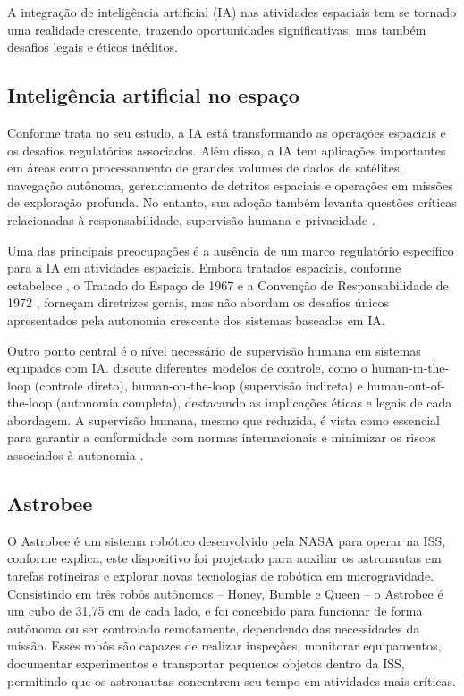 A integração de inteligência artificial (IA) nas atividades espaciais tem se tornado uma realidade crescente, trazendo oportunidades significativas, mas também desafios legais e éticos inéditos. 

\subsection{Inteligência artificial no espaço}

Conforme \cite{martin2021} trata no seu estudo, a IA está transformando as operações espaciais e os desafios regulatórios associados. Além disso, a IA tem aplicações importantes em áreas como processamento de grandes volumes de dados de satélites, navegação autônoma, gerenciamento de detritos espaciais e operações em missões de exploração profunda. No entanto, sua adoção também levanta questões críticas relacionadas à responsabilidade, supervisão humana e privacidade \cite{martin2021}.

Uma das principais preocupações é a ausência de um marco regulatório específico para a IA em atividades espaciais. Embora tratados espaciais, conforme estabelece \cite{unodaOuterSpaceTreaty}, o Tratado do Espaço de 1967 e a Convenção de Responsabilidade de 1972 \cite{camaraDecreto77}, forneçam diretrizes gerais, mas não abordam os desafios únicos apresentados pela autonomia crescente dos sistemas baseados em IA.

Outro ponto central é o nível necessário de supervisão humana em sistemas equipados com IA. \cite{martin2021} discute diferentes modelos de controle, como o human-in-the-loop (controle direto), human-on-the-loop (supervisão indireta) e human-out-of-the-loop (autonomia completa), destacando as implicações éticas e legais de cada abordagem. A supervisão humana, mesmo que reduzida, é vista como essencial para garantir a conformidade com normas internacionais e minimizar os riscos associados à autonomia \cite{martin2021}.

\subsection{Astrobee}

O Astrobee é um sistema robótico desenvolvido pela NASA para operar na ISS, conforme \cite{nasaAstrobee} explica, este dispositivo foi projetado para auxiliar os astronautas em tarefas rotineiras e explorar novas tecnologias de robótica em microgravidade. Consistindo em três robôs autônomos – Honey, Bumble e Queen – o Astrobee é um cubo de 31,75 cm de cada lado, e foi concebido para funcionar de forma autônoma ou ser controlado remotamente, dependendo das necessidades da missão. Esses robôs são capazes de realizar inspeções, monitorar equipamentos, documentar experimentos e transportar pequenos objetos dentro da ISS, permitindo que os astronautas concentrem seu tempo em atividades mais críticas.

